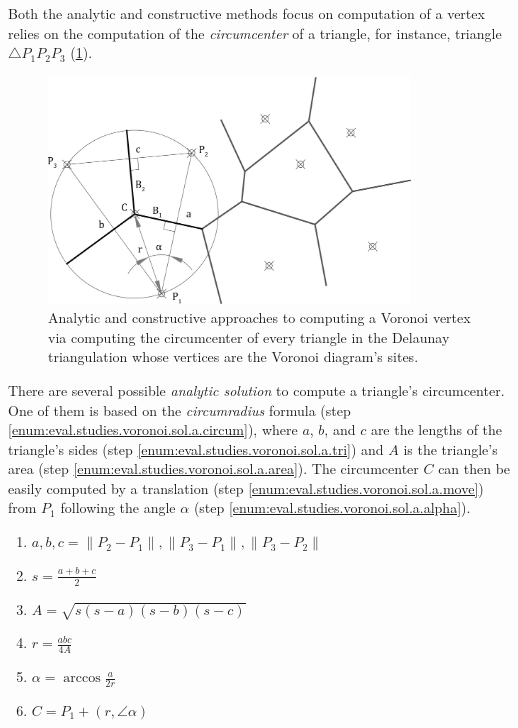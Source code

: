 Both the analytic and constructive methods focus on computation of a vertex
relies on the computation of the \textit{circumcenter} of a triangle, for
instance, triangle $\triangle P_1 P_2 P_3$
(\cref{fig:eval.studies.voronoi.sol}).

\begin{figure}[htb]
  \centering
  \includegraphics[height=6cm]{fig/voronoi-solution}
  \caption[Voronoi problem partial solution]{
    Analytic and constructive approaches to computing a Voronoi vertex via
    computing the circumcenter of every triangle in the Delaunay triangulation
    whose vertices are the Voronoi diagram's sites.}%
  \label{fig:eval.studies.voronoi.sol}
\end{figure}

There are several possible \textit{analytic solution} to compute a triangle's
circumcenter.  One of them is based on the \textit{circumradius} formula (step
\ref{enum:eval.studies.voronoi.sol.a.circum}), where $a$, $b$, and $c$ are the
lengths of the triangle's sides (step
\ref{enum:eval.studies.voronoi.sol.a.tri}) and $A$ is the triangle's area (step
\ref{enum:eval.studies.voronoi.sol.a.area}).  The circumcenter $C$ can then be
easily computed by a translation (step
\ref{enum:eval.studies.voronoi.sol.a.move}) from $P_1$ following the angle
$\alpha$ (step \ref{enum:eval.studies.voronoi.sol.a.alpha}).

\begin{enumerate}
  \item $a, b, c = \lVert P_2 - P_1 \rVert, \lVert P_3 - P_1 \rVert, \lVert P_3
  - P_2 \rVert$%
  \label{enum:eval.studies.voronoi.sol.a.tri}
  \item $s = \frac{a + b + c}{2}$
  \item $A = \sqrt{s(s - a)(s - b)(s - c)}$%
  \label{enum:eval.studies.voronoi.sol.a.area}
  \item $r = \frac{abc}{4A}$%
  \label{enum:eval.studies.voronoi.sol.a.circum}
  \item $\alpha = \arccos\frac{a}{2r}$%
  \label{enum:eval.studies.voronoi.sol.a.alpha}
  \item $C = P_1 + \left(r, \angle\alpha\right)$%
  \label{enum:eval.studies.voronoi.sol.a.move}
\end{enumerate}

